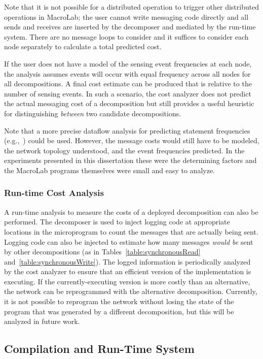Note that it is not possible for a distributed operation to trigger
other distributed operations in MacroLab; the user cannot write
messaging code directly and all sends and receives are inserted by the
decomposer and mediated by the run-time system. There are no message
loops to consider and it suffices to consider each node separately to
calculate a total predicted cost. 

If the user does not have a model of the sensing event frequencies at each
node, the analysis assumes events will occur with equal frequency across
all nodes for all decompositions. A final cost estimate can be
produced that is relative to the number of sensing events. In such a
scenario, the cost analyzer does not predict the actual messaging cost of a
decomposition but still provides a useful heuristic for distinguishing
\emph{between} two candidate decompositions.  

Note that a more precise dataflow analysis for predicting statement frequencies
(e.g.,~\cite{Ramalingam}) could be used. However, the message costs would still
have to be modeled, the network topology understood, and the event frequencies
predicted.  In the experiments presented in this dissertation these were the
determining factors and the MacroLab programs themselves were small and easy to
analyze.


\subsubsection{Run-time Cost Analysis}\label{sect:runtimeCost}

A run-time analysis to measure the costs of a deployed decomposition can also be
performed. The decomposer is used to inject logging code at appropriate
locations in the microprogram to count the messages that are actually being
sent. Logging code can also be injected to estimate how many messages {\em would
be} sent by other decompositions (as in Tables~\ref{table:synchronousRead}
and~\ref{table:synchronousWrite}). The logged information is periodically
analyzed by the cost analyzer to ensure that an efficient version of the
implementation is executing. If the currently-executing version is more costly
than an alternative, the network can be reprogrammed with the alternative
decomposition. Currently, it is not possible to reprogram the network without
losing the state of the program that was generated by a different decomposition,
but this will be analyzed in future work.


\subsection{Compilation and Run-Time System} \label{sect:RTS}


